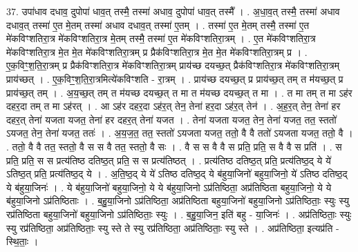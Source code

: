 \documentclass[17pt]{extarticle}
\begin{document}
37. उपा॑धाव दधाव॒ दुपोपा॑ धाव॒त् तस्मै॒ तस्मा॑ अधाव॒ दुपोपा॑ धाव॒त् तस्मै᳚ । . अ॒धा॒व॒त् तस्मै॒ तस्मा॑ अधाव दधाव॒त् तस्मा॑ ए॒त मे॒तम् तस्मा॑ अधाव दधाव॒त् तस्मा॑ ए॒तम् । . तस्मा॑ ए॒त मे॒तम् तस्मै॒ तस्मा॑ ए॒त मे॑कविꣳशतिरा॒त्र मे॑कविꣳशतिरा॒त्र मे॒तम् तस्मै॒ तस्मा॑ ए॒त मे॑कविꣳशतिरा॒त्रम् । . ए॒त मे॑कविꣳशतिरा॒त्र मे॑कविꣳशतिरा॒त्र मे॒त मे॒त मे॑कविꣳशतिरा॒त्रम् प्र प्रैक॑विꣳशतिरा॒त्र मे॒त मे॒त मे॑कविꣳशतिरा॒त्रम् प्र । . ए॒क॒विꣳ॒॒श॒ति॒रा॒त्रम् प्र प्रैक॑विꣳशतिरा॒त्र मे॑कविꣳशतिरा॒त्रम् प्राय॑च्छ दयच्छ॒त् प्रैक॑विꣳशतिरा॒त्र मे॑कविꣳशतिरा॒त्रम् प्राय॑च्छत् । . ए॒क॒विꣳ॒॒श॒ति॒रा॒त्रमित्ये॑कविꣳशति - रा॒त्रम् । . प्राय॑च्छ दयच्छ॒त् प्र प्राय॑च्छ॒त् तम् त म॑यच्छ॒त् प्र प्राय॑च्छ॒त् तम् । . अ॒य॒च्छ॒त् तम् त म॑यच्छ दयच्छ॒त् त मा त म॑यच्छ दयच्छ॒त् त मा । . त मा तम् त मा ऽह॑र दहर॒दा तम् त मा ऽह॑रत् । . आ ऽह॑र दहर॒दा ऽह॑र॒त् तेन॒ तेना॑ हर॒दा ऽह॑र॒त् तेन॑ । . अ॒ह॒र॒त् तेन॒ तेना॑ हर दहर॒त् तेना॑ यजता यजत॒ तेना॑ हर दहर॒त् तेना॑ यजत । . तेना॑ यजता यजत॒ तेन॒ तेना॑ यजत॒ तत॒ स्ततो॑ ऽयजत॒ तेन॒ तेना॑ यजत॒ ततः॑ । . अ॒य॒ज॒त॒ तत॒ स्ततो॑ ऽयजता यजत॒ ततो॒ वै वै ततो॑ ऽयजता यजत॒ ततो॒ वै । . ततो॒ वै वै तत॒ स्ततो॒ वै स स वै तत॒ स्ततो॒ वै सः । . वै स स वै वै स प्रति॒ प्रति॒ स वै वै स प्रति॑ । . स प्रति॒ प्रति॒ स स प्रत्य॑तिष्ठ दतिष्ठ॒त् प्रति॒ स स प्रत्य॑तिष्ठत् । . प्रत्य॑तिष्ठ दतिष्ठ॒त् प्रति॒ प्रत्य॑तिष्ठ॒द् ये ये॑ ऽतिष्ठ॒त् प्रति॒ प्रत्य॑तिष्ठ॒द् ये । . अ॒ति॒ष्ठ॒द् ये ये॑ ऽतिष्ठ दतिष्ठ॒द् ये ब॑हुया॒जिनो॑ बहुया॒जिनो॒ ये॑ ऽतिष्ठ दतिष्ठ॒द् ये ब॑हुया॒जिनः॑ । . ये ब॑हुया॒जिनो॑ बहुया॒जिनो॒ ये ये ब॑हुया॒जिनो ऽप्र॑तिष्ठिता॒ अप्र॑तिष्ठिता बहुया॒जिनो॒ ये ये 
ब॑हुया॒जिनो ऽप्र॑तिष्ठिताः । . ब॒हु॒या॒जिनो ऽप्र॑तिष्ठिता॒ अप्र॑तिष्ठिता बहुया॒जिनो॑ बहुया॒जिनो ऽप्र॑तिष्ठिताः॒ स्युः स्यु रप्र॑तिष्ठिता बहुया॒जिनो॑ बहुया॒जिनो ऽप्र॑तिष्ठिताः॒ स्युः । . ब॒हु॒या॒जिन॒ इति॑ बहु - या॒जिनः॑ । . अप्र॑तिष्ठिताः॒ स्युः स्यु रप्र॑तिष्ठिता॒ अप्र॑तिष्ठिताः॒ स्यु स्ते ते स्यु रप्र॑तिष्ठिता॒ अप्र॑तिष्ठिताः॒ स्यु स्ते । . अप्र॑तिष्ठिता॒ इत्यप्र॑ति - स्थि॒ताः॒ । \newline
\pagebreak
{}
\end{document}
